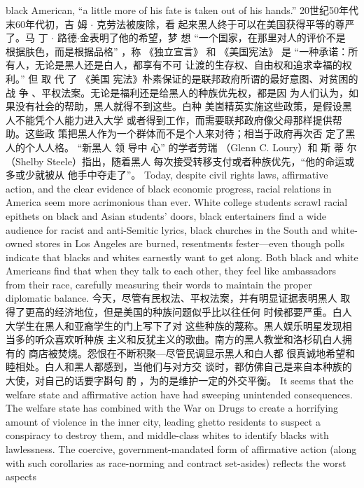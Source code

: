 \begin{paracol}{2}
black American, ``a little more of his fate is taken out of his
hands.''
\switchcolumn
20世纪50年代末60年代初，吉 姆 $\cdot$ 克劳法被废除，看
起来黑人终于可以在美国获得平等的尊严了。马 丁 $\cdot$ 路德$\cdot$金表明了他的希望，梦 想 “一个国家，在那里对人的评价不是
根据肤色，而是根据品格” ，称 《独立宣言》 和 《美国宪法》
是 “一种承诺：所有人，无论是黑人还是白人，都享有不可
让渡的生存权、自由权和追求幸福的权利。” 但 取 代 了 《美国
宪法》朴素保证的是联邦政府所谓的最好意图、对贫困的战
争 、平权法案。无论是福利还是给黑人的种族优先权，都是因
为人们认为，如果没有社会的帮助，黑人就得不到这些。白种
美崮精英实施这些政策，是假设黑人不能凭个人能力进入大学
或者得到工作，而需要联邦政府像父母那样提供帮助。这些政
策把黑人作为一个群体而不是个人来对待；相当于政府再次否
定了黑人的个人人格。 “新黑人 领 导中 心” 的学者劳瑞
（Glenn C. Loury）和 斯 蒂 尔 （Shelby  Steele）指出，随着黑人
每次接受转移支付或者种族优先，“他的命运或多或少就被从
他手中夺走了”。
\switchcolumn*
Today, despite civil rights laws, affirmative action, and the
clear evidence of black economic progress, racial relations in
America seem more acrimonious than ever. White college students scrawl racial epithets on black and Asian students' doors,
black entertainers find a wide audience for racist and anti-Semitic lyrics, black churches in the South and white-owned
stores in Los Angeles are burned, resentments fester---even
though polls indicate that blacks and whites earnestly want to
get along. Both black and white Americans find that when they
talk to each other, they feel like ambassadors from their race,
carefully measuring their words to maintain the proper diplomatic balance.
\switchcolumn
今天，尽管有民权法、平权法案，并有明显证据表明黑人
取得了更高的经济地位，但是美国的种族问题似乎比以往任何
时候都要严重。白人大学生在黑人和亚裔学生的门上写下了对
这些种族的蔑称。黑人娱乐明星发现相当多的听众喜欢听种族
主义和反犹主义的歌曲。南方的黑人教堂和洛杉矶白人拥有的
商店被焚烧。怨恨在不断积聚---尽管民调显示黑人和白人都
很真诚地希望和睦相处。白人和黑人都感到，当他们与对方交
谈时，都仿佛自己是来自本种族的大使，对自己的话要字斟句
酌 ，为的是维护一定的外交平衡。
\switchcolumn*
It seems that the welfare state and affirmative action have
had sweeping unintended consequences. The welfare state has
combined with the War on Drugs to create a horrifying amount
of violence in the inner city, leading ghetto residents to suspect
a conspiracy to destroy them, and middle-class whites to identify blacks with lawlessness. The coercive, government-mandated form of affirmative action (along with such corollaries as
race-norming and contract set-asides) reflects the worst aspects

\end{paracol}
